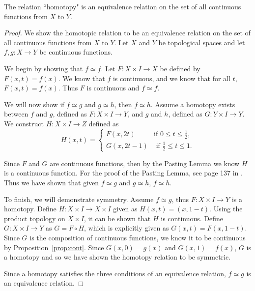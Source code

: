 \begin{prop}
The relation ``homotopy" is an equivalence relation on the set of all continuous functions from $X$ to $Y$.
\end{prop}

\begin{proof}
We show the homotopic relation to be an equivalence relation on the set of all continuous functions from $X$ to $Y$. Let $X$ and $Y$ be topological spaces and let $f,g\colon X \rightarrow Y$ be continuous functions. 

We begin by showing that $f\simeq f$. Let $F\colon X \times I \rightarrow X$ be defined by $F(x,t)=f(x)$. We know that $f$ is continuous, and we know that for all $t$, $F(x,t)=f(x)$. Thus $F$ is continuous and $f\simeq f$.

We will now show if $f\simeq g$ and $g \simeq h$, then $f \simeq h$. Assume a homotopy exists between $f$ and $g$, defined as $F\colon X\times I \rightarrow Y$, and $g$ and $h$, defined as $G\colon Y\times I \rightarrow Y$. We construct $H\colon X\times I \rightarrow Z$ defined as 
\begin{displaymath}
   H(x,t) = \left\{
     \begin{array}{lr}
       F(x,2t)  &   \text{if } 0\leq t\leq \frac{1}{2},\\
       G(x,2t-1) &  \text{ if } \frac{1}{2}\leq t\leq 1\text{.}
     \end{array}
   \right.
\end{displaymath} 

Since $F$ and $G$ are continuous functions, then by the Pasting Lemma we know $H$ is a continuous function. For the proof of the Pasting Lemma, see page 137 in \cite{top}. Thus we have shown that given $f\simeq g$ and $g \simeq h$, $f \simeq h$.

To finish, we will demonstrate symmetry. Assume $f\simeq g$, thus $F\colon X \times I \rightarrow Y$ is a homotopy. Define $H\colon X \times I \rightarrow X \times I$ given as $H(x,t) = (x, 1-t)$. Using the product topology on $X\times I$, it can be shown that $H$ is continuous. Define $G\colon X\times I \rightarrow Y$ as $G= F\circ H$, which is explicitly given as $G(x,t)=F(x,1-t)$. Since $G$ is the composition of continuous functions, we know it to be continuous by Proposition~\ref{prop:cont}. Since $G(x,0)=g(x)$ and $G(x,1)=f(x)$, $G$ is a homotopy and so we have shown the homotopy relation to be symmetric.

Since a homotopy satisfies the three conditions of an equivalence relation, $f\simeq g$ is an equivalence relation.
\end{proof}

